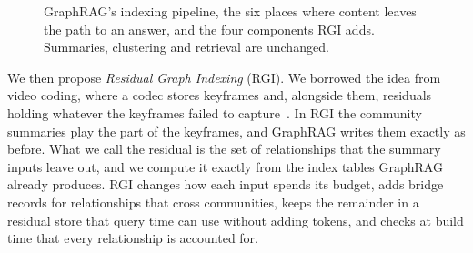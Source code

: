 \documentclass{ieeeaccess}
\theoremstyle{remark}
\begin{document}
\begin{figure}[t]
{}
\caption{GraphRAG's indexing pipeline, the six places where content leaves the path to an answer, and the four components RGI adds. Summaries, clustering and retrieval are unchanged.}
\label{fig:pipeline}
\end{figure}

We then propose \emph{Residual Graph Indexing} (RGI). We borrowed the idea from video coding, where a codec stores keyframes and, alongside them, residuals holding whatever the keyframes failed to capture~\cite{wiegand2003h264}. In RGI the community summaries play the part of the keyframes, and GraphRAG writes them exactly as before. What we call the residual is the set of relationships that the summary inputs leave out, and we compute it exactly from the index tables GraphRAG already produces. RGI changes how each input spends its budget, adds bridge records for relationships that cross communities, keeps the remainder in a residual store that query time can use without adding tokens, and checks at build time that every relationship is accounted for.
\end{document}

